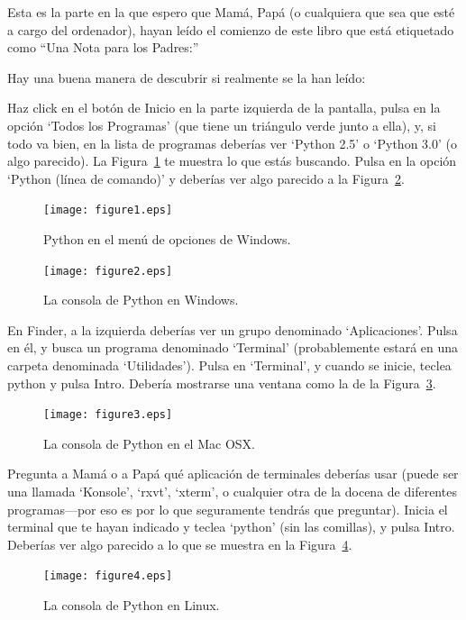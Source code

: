 Esta es la parte en la que espero que Mamá, Papá (o cualquiera que sea que esté a cargo del ordenador), hayan leído el comienzo de este libro que está etiquetado como ``Una Nota para los Padres:''

\noindent
Hay una buena manera de descubrir si realmente se la han leído:

\begin{WINDOWS}
Haz click en el botón de Inicio en la parte izquierda de la pantalla, pulsa en la opción `Todos los Programas' (que tiene un triángulo verde junto a ella), y, si todo va bien, en la lista de programas deberías ver `Python 2.5' o `Python 3.0' (o algo parecido). La Figura~\ref{fig1} te muestra lo que estás buscando. Pulsa en la opción `Python (línea de comando)' y deberías ver algo parecido a la Figura~\ref{fig2}.

\begin{figure}
\begin{center}
\texttt{[image: figure1.eps]}
\end{center}
\caption{Python en el menú de opciones de Windows.}\label{fig1}
\end{figure}

\begin{figure}
\begin{center}
\texttt{[image: figure2.eps]}
\end{center}
\caption{La consola de Python en Windows.}\label{fig2}
\end{figure}
\end{WINDOWS}

\begin{MAC}
En Finder, a la izquierda deberías ver un grupo denominado `Aplicaciones'. Pulsa en él, y busca un programa denominado `Terminal' (probablemente estará en una carpeta denominada `Utilidades').
Pulsa en `Terminal', y cuando se inicie, teclea python y pulsa Intro. Debería mostrarse una ventana como la de la Figura~\ref{fig3}.

\begin{figure}
\begin{center}
\texttt{[image: figure3.eps]}
\end{center}
\caption{La consola de Python en el Mac OSX.}\label{fig3}
\end{figure}
\end{MAC}

\begin{LINUX}
Pregunta a Mamá o a Papá qué aplicación de terminales deberías usar (puede ser una llamada `Konsole', `rxvt', `xterm', o cualquier otra de la docena de diferentes programas---por eso es por lo que seguramente tendrás que preguntar). Inicia el terminal que te hayan indicado y teclea `python' (sin las comillas), y pulsa Intro. Deberías ver algo parecido a lo que se muestra en la Figura~\ref{fig4}.

\begin{figure}
\begin{center}
\texttt{[image: figure4.eps]}
\end{center}
\caption{La consola de Python en Linux.}\label{fig4}
\end{figure}
\end{LINUX}

